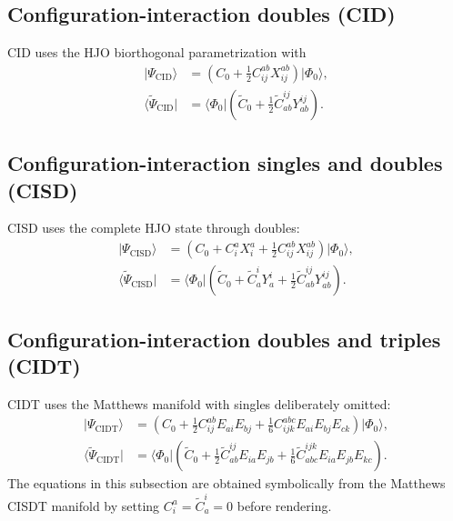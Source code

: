 \documentclass[10pt]{article}
\numberwithin{equation}{section}
\newcommand{\vac}{\Phi_0}
\begin{document}


\clearpage
\subsection{Configuration-interaction doubles (CID)}

CID uses the HJO biorthogonal parametrization with
\begin{align}
 \lvert\Psi_{\mathrm{CID}}\rangle
 &=\left(C_0+\frac12C_{ij}^{ab}X_{ij}^{ab}\right)\lvert\vac\rangle,
 \\
 \langle\widetilde\Psi_{\mathrm{CID}}\rvert
 &=\langle\vac\rvert\left(
 \widetilde C_0+\frac12\widetilde C_{ab}^{ij}Y_{ab}^{ij}
 \right).
\end{align}



\clearpage
\subsection{Configuration-interaction singles and doubles (CISD)}

CISD uses the complete HJO state through doubles:
\begin{align}
 \lvert\Psi_{\mathrm{CISD}}\rangle
 &=\left(C_0+C_i^aX_i^a+\frac12C_{ij}^{ab}X_{ij}^{ab}\right)
 \lvert\vac\rangle,
 \\
 \langle\widetilde\Psi_{\mathrm{CISD}}\rvert
 &=\langle\vac\rvert\left(
 \widetilde C_0+\widetilde C_a^iY_a^i
 +\frac12\widetilde C_{ab}^{ij}Y_{ab}^{ij}
 \right).
\end{align}

\begingroup
\small
\setlength{\jot}{1pt}

\endgroup

\clearpage
\subsection{Configuration-interaction doubles and triples (CIDT)}

CIDT uses the Matthews manifold with singles deliberately omitted:
\begin{align}
 \lvert\Psi_{\mathrm{CIDT}}\rangle
 &=\left(
 C_0+\frac12C_{ij}^{ab}E_{ai}E_{bj}
 +\frac16C_{ijk}^{abc}E_{ai}E_{bj}E_{ck}
 \right)\lvert\vac\rangle,
 \\
 \langle\widetilde\Psi_{\mathrm{CIDT}}\rvert
 &=\langle\vac\rvert\left(
 \widetilde C_0+\frac12\widetilde C_{ab}^{ij}E_{ia}E_{jb}
 +\frac16\widetilde C_{abc}^{ijk}E_{ia}E_{jb}E_{kc}
 \right).
\end{align}
The equations in this subsection are obtained symbolically from the Matthews
CISDT manifold by setting $C_i^a=\widetilde C_a^i=0$ before rendering.
\end{document}
